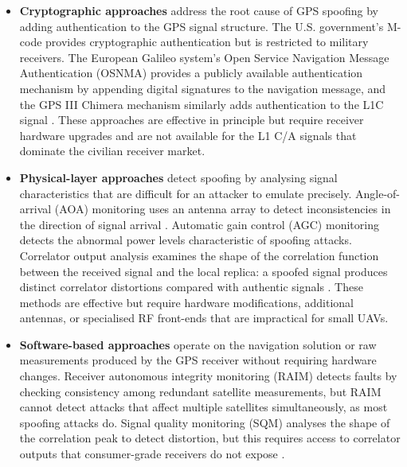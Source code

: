 \documentclass[electronics,article,accept,moreauthors]{Definitions/mdpi}
\begin{document}
\begin{itemize}
    \item \textbf{Cryptographic approaches} address the root cause of GPS spoofing by adding authentication to the GPS signal structure. The U.S. government's M-code provides cryptographic authentication but is restricted to military receivers. The European Galileo system's Open Service Navigation Message Authentication (OSNMA) provides a publicly available authentication mechanism by appending digital signatures to the navigation message, and the GPS III Chimera mechanism similarly adds authentication to the L1C signal \citep{schmidt2016}. These approaches are effective in principle but require receiver hardware upgrades and are not available for the L1 C/A signals that dominate the civilian receiver market.
    
    \item \textbf{Physical-layer approaches} detect spoofing by analysing signal characteristics that are difficult for an attacker to emulate precisely. Angle-of-arrival (AOA) monitoring uses an antenna array to detect inconsistencies in the direction of signal arrival \citep{magiera2015}. Automatic gain control (AGC) monitoring detects the abnormal power levels characteristic of spoofing attacks. Correlator output analysis examines the shape of the correlation function between the received signal and the local replica: a spoofed signal produces distinct correlator distortions compared with authentic signals \citep{schmidt2020}. These methods are effective but require hardware modifications, additional antennas, or specialised RF front-ends that are impractical for small UAVs.
    
    \item \textbf{Software-based approaches} operate on the navigation solution or raw measurements produced by the GPS receiver without requiring hardware changes. Receiver autonomous integrity monitoring (RAIM) detects faults by checking consistency among redundant satellite measurements, but RAIM cannot detect attacks that affect multiple satellites simultaneously, as most spoofing attacks do. Signal quality monitoring (SQM) analyses the shape of the correlation peak to detect distortion, but this requires access to correlator outputs that consumer-grade receivers do not expose \citep{ranganathan2016}.


\end{itemize}
\end{document}
